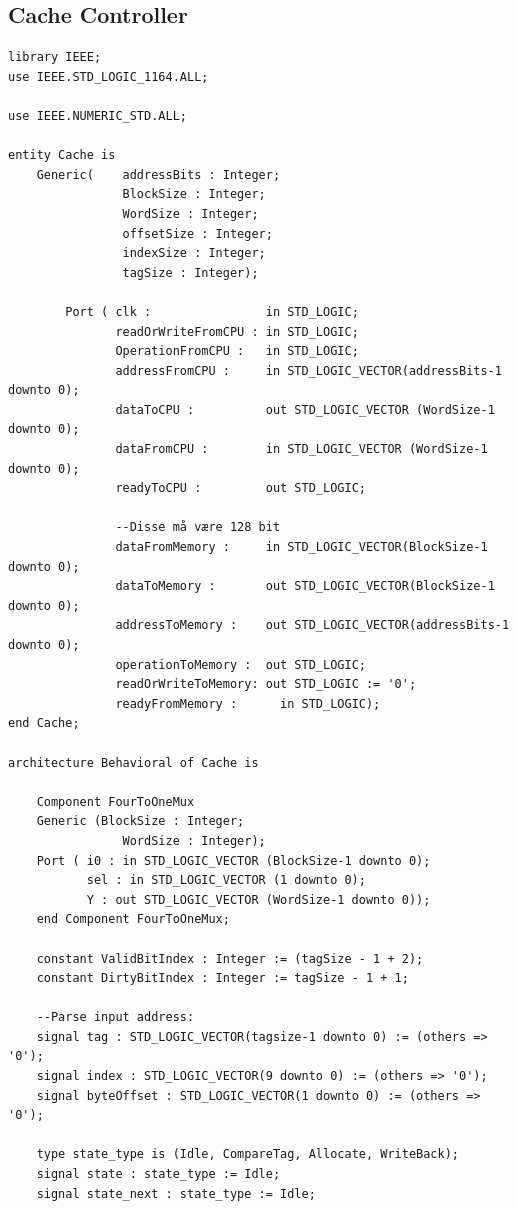 \documentclass{article}
\begin{document}
\subsection{Cache Controller}
\begin{lstlisting}
library IEEE;
use IEEE.STD_LOGIC_1164.ALL;

use IEEE.NUMERIC_STD.ALL;

entity Cache is
    Generic(    addressBits : Integer;
                BlockSize : Integer;
                WordSize : Integer;
                offsetSize : Integer;
                indexSize : Integer;
                tagSize : Integer); 
                  
        Port ( clk :                in STD_LOGIC;
               readOrWriteFromCPU : in STD_LOGIC;
               OperationFromCPU :   in STD_LOGIC;
               addressFromCPU :     in STD_LOGIC_VECTOR(addressBits-1 downto 0);
               dataToCPU :          out STD_LOGIC_VECTOR (WordSize-1 downto 0);
               dataFromCPU :        in STD_LOGIC_VECTOR (WordSize-1 downto 0);
               readyToCPU :         out STD_LOGIC;
               
               --Disse må være 128 bit
               dataFromMemory :     in STD_LOGIC_VECTOR(BlockSize-1 downto 0);
               dataToMemory :       out STD_LOGIC_VECTOR(BlockSize-1 downto 0);
               addressToMemory :    out STD_LOGIC_VECTOR(addressBits-1 downto 0);
               operationToMemory :  out STD_LOGIC;
               readOrWriteToMemory: out STD_LOGIC := '0';
               readyFromMemory :      in STD_LOGIC);
end Cache;

architecture Behavioral of Cache is

    Component FourToOneMux
    Generic (BlockSize : Integer;
                WordSize : Integer);
    Port ( i0 : in STD_LOGIC_VECTOR (BlockSize-1 downto 0);
           sel : in STD_LOGIC_VECTOR (1 downto 0);
           Y : out STD_LOGIC_VECTOR (WordSize-1 downto 0));
    end Component FourToOneMux;

    constant ValidBitIndex : Integer := (tagSize - 1 + 2);
    constant DirtyBitIndex : Integer := tagSize - 1 + 1;
    
    --Parse input address:
    signal tag : STD_LOGIC_VECTOR(tagsize-1 downto 0) := (others => '0');
    signal index : STD_LOGIC_VECTOR(9 downto 0) := (others => '0');
    signal byteOffset : STD_LOGIC_VECTOR(1 downto 0) := (others => '0');
    
    type state_type is (Idle, CompareTag, Allocate, WriteBack);
    signal state : state_type := Idle;
    signal state_next : state_type := Idle;
    

\end{lstlisting}
\end{document}
